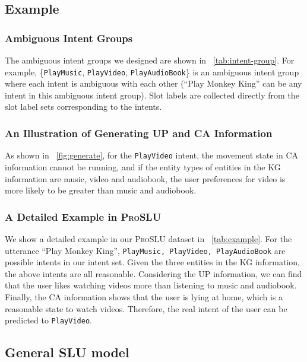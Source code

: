 \documentclass[letterpaper]{article} \usepackage{aaai22}  \usepackage{times}  \usepackage{helvet}  \usepackage{courier}  \usepackage[hyphens]{url}  \usepackage{graphicx} \urlstyle{rm} \def\UrlFont{\rm}  \usepackage{natbib}  \usepackage{caption} \DeclareCaptionStyle{ruled}{labelfont=normalfont,labelsep=colon,strut=off} \frenchspacing  \setlength{\pdfpagewidth}{8.5in}  \setlength{\pdfpageheight}{11in}  \usepackage{algorithm}
\begin{document}
\subsection{Example}
\label{appendix:example}
\subsubsection{Ambiguous Intent Groups}
The ambiguous intent groups we designed are shown in \tablename~\ref{tab:intent-group}. 
For example, \{\texttt{PlayMusic}, \texttt{PlayVideo}, \texttt{PlayAudioBook}\} is an ambiguous intent group where each intent is ambiguous with each other (``Play Monkey King'' can be any intent in this ambiguous intent group).
Slot labels are collected directly from the slot label sets corresponding to the intents.

\subsubsection{An Illustration of Generating UP and CA Information}
As shown in \figurename~\ref{fig:generate}, for the \texttt{PlayVideo} intent, the movement state in CA information cannot be running, and if the entity types of entities in the KG information are music, video and audiobook,
the user preferences for video is more likely to be greater than music and audiobook.

\subsubsection{A Detailed Example in \textsc{ProSLU}}
We show a detailed example in our \textsc{ProSLU} dataset in \tablename~\ref{tab:example}. 
For the utterance ``Play Monkey King'', \texttt{PlayMusic, PlayVideo, PlayAudioBook} are possible intents in our intent set. 
Given the three entities in the KG information, the above intents are all reasonable. 
Considering the UP information, we can find that the user likes watching videos more than listening to music and audiobook. Finally, the CA information shows that the user is lying at home, which is a reasonable state to watch videos. Therefore, the real intent of the user can be predicted to \texttt{PlayVideo}.

\subsection{General SLU model}
\label{appendix:general-slu-model}
\end{document}
